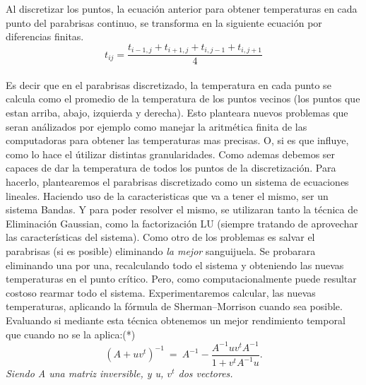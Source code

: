 Al discretizar los puntos, la ecuación anterior para obtener temperaturas en cada punto del parabrisas continuo, se transforma en la siguiente ecuación por diferencias finitas.
\begin{equation}
t_{ij} = \frac{t_{i-1,j} + t_{i+1,j} + t_{i,j-1} + t_{i,j+1}}{4}
\end{equation}\\
Es decir que en el parabrisas discretizado, la temperatura en cada punto se calcula como el promedio de la temperatura de los puntos vecinos (los puntos que estan arriba, abajo, izquierda y derecha).\newline
Esto planteara nuevos problemas que seran análizados por ejemplo como manejar la aritmética finita de las computadoras para obtener las temperaturas mas precisas. O, si es que influye, como lo hace el útilizar distintas granularidades.\newline
Como ademas debemos ser capaces de dar la temperatura de todos los puntos de la discretización. Para hacerlo, plantearemos el parabrisas discretizado como un sistema de ecuaciones lineales. Haciendo uso de la caracteristicas que va a tener el mismo, ser un sistema Bandas. 
 Y para poder resolver el mismo, se utilizaran tanto la técnica de Eliminación Gaussian, como la factorización LU (siempre tratando de aprovechar las características del sistema).\newline
Como otro de los problemas es salvar el parabrisas (si es posible) eliminando \textit{la mejor} sanguijuela. Se probarara eliminando una por una, recalculando todo el sistema y  obteniendo las nuevas temperaturas en el punto crítico. Pero, como computacionalmente puede resultar costoso rearmar todo el sistema. Experimentaremos calcular, las nuevas temperaturas, aplicando la fórmula de Sherman–Morrison cuando sea posible. Evaluando si mediante esta técnica obtenemos un mejor rendimiento temporal que cuando no se la aplica:(*)
\begin{equation}
	(A+ uv^t)^{-1} \ =\ A^{-1} - \frac{ A^{-1} u v^t A^{-1} }{1+v^t A^{-1}u}.\label{eq:sm}
\end{equation} 
\textit{Siendo A una matriz inversible, y u, $v^t$ dos vectores.}   
   
\newpage
